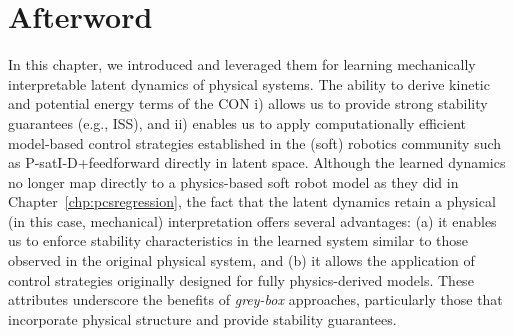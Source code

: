 \section*{Afterword}
In this chapter, we introduced  and leveraged them for learning mechanically interpretable latent dynamics of physical systems.
The ability to derive kinetic and potential energy terms of the \gls{CON} i) allows us to provide strong stability guarantees (e.g., \gls{ISS}), and ii) enables us to apply computationally efficient model-based control strategies established in the (soft) robotics community such as P-satI-D+feedforward directly in latent space.
Although the learned dynamics no longer map directly to a physics-based soft robot model as they did in Chapter~\ref{chp:pcsregression}, the fact that the latent dynamics retain a physical (in this case, mechanical) interpretation offers several advantages: (a) it enables us to enforce stability characteristics in the learned system similar to those observed in the original physical system, and (b) it allows the application of control strategies originally designed for fully physics-derived models. These attributes underscore the benefits of \emph{grey-box} approaches, particularly those that incorporate physical structure and provide stability guarantees.

